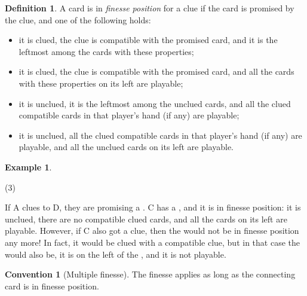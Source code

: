 \documentclass[a4paper]{article}
\theoremstyle{plain}
\theoremstyle{definition}
\newtheorem{definition}[theorem]{Definition}
\newtheorem{example}[theorem]{Example}
\newtheorem{convention}[theorem]{Convention}
\begin{document}
\begin{definition}
	\label{def:finesse-position}
	A card is in \emph{finesse position} for a clue if the card is promised by the clue, and one of the following holds:
	
	\begin{itemize}
		\item it is clued, the clue is compatible with the promised card, and it is the leftmost among the cards with these properties;
		\item it is clued, the clue is compatible with the promised card, and all the cards with these properties on its left are playable;
		\item it is unclued, it is the leftmost among the unclued cards, and all the clued compatible cards in that player's hand (if any) are playable;
		\item it is unclued, all the clued compatible cards in that player's hand (if any) are playable, and all the unclued cards on its left are playable.
	\end{itemize}
\end{definition}

\begin{example}
	\hfill
	\begin{tasks}(3)
		\task[+]      
		\task[A]    
		\task[B]    
		\task[C]    
		\task[D]    
		\task[E]    
	\end{tasks}
	
	If A clues  to D, they are promising a . C has a , and it is in finesse position: it is unclued, there are no compatible clued cards, and all the cards on its left are playable. However, if C also got a  clue, then the  would not be in finesse position any more! In fact, it would be clued with a compatible clue, but in that case the  would also be, it is on the left of the , and it is not playable.
\end{example}

\begin{convention}[Multiple finesse]
	\label{multiple-finesse}
	The finesse applies as long as the connecting card is in finesse position.
\end{convention}
\end{document}
